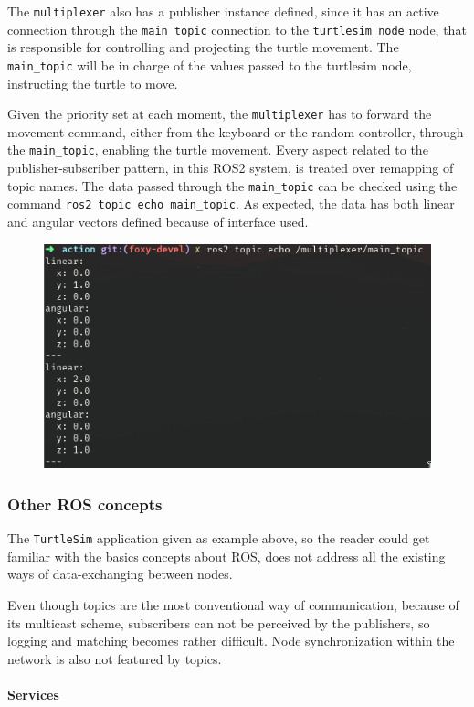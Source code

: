 The \texttt{multiplexer} also has a publisher instance defined, since it has an active connection through the \texttt{main\_topic} connection to the \texttt{turtlesim\_node} node, that is responsible for controlling and projecting the turtle movement. The \texttt{main\_topic} will be in charge of the values passed to the turtlesim node, instructing the turtle to move.

Given the priority set at each moment, the \texttt{multiplexer} has to forward the movement command, either from the keyboard or the random controller, through the \texttt{main\_topic}, enabling the turtle movement. Every aspect related to the publisher-subscriber pattern, in this ROS2 system, is treated over remapping of topic names. The data passed through the \texttt{main\_topic} can be checked using the command \texttt{ros2 topic echo main\_topic}. As expected, the data has both linear and angular vectors defined because of interface used.

\begin{figure}[H]
        \centering
        \includegraphics[width=0.5\linewidth]{images/ts_main_topicinfo.png}
\end{figure}

\subsubsection{Other ROS concepts}

The \texttt{TurtleSim} application given as example above, so the reader could get familiar with the basics concepts about ROS, does not address all the existing ways of data-exchanging between nodes.
                
Even though topics are the most conventional way of communication, because of its multicast scheme, subscribers can not be perceived by the publishers, so logging and matching becomes rather difficult. Node synchronization within the network is also not featured by topics.

\paragraph{Services}

